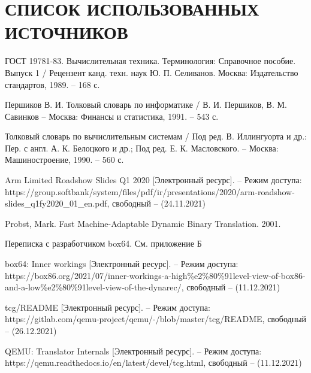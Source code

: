 \section*{СПИСОК ИСПОЛЬЗОВАННЫХ ИСТОЧНИКОВ}

\begingroup
\renewcommand{\section}[2]{}
\begin{thebibliography}{}
	ГОСТ 19781-83. Вычислительная техника. Терминология: Справочное пособие. Выпуск 1 / Рецензент канд. техн. наук Ю. П. Селиванов. Москва: Издательство стандартов, 1989. -- 168 с.
		 		 
	Першиков В. И. Толковый словарь по информатике / В. И. Першиков, В. М. Савинков -- Москва: Финансы и статистика, 1991. -- 543 с.
	
	Толковый словарь по вычислительным системам / Под ред. В. Иллингуорта и др.: Пер. с англ. А. К. Белоцкого и др.; Под ред. Е. К. Масловского. -- Москва: Машиностроение, 1990. -- 560 с.
	
	Arm Limited	Roadshow Slides	Q1 2020 [Электронный ресурс]. -- Режим доступа: https://group.softbank/system/files/pdf/ir/presentations/2020/arm-roadshow-slides\_q1fy2020\_01\_en.pdf,
	свободный -- (24.11.2021)
	
	Probst, Mark. Fast Machine-Adaptable Dynamic Binary Translation. 2001.
	
	Переписка с разработчиком box64. См. приложение Б
	
	box64: Inner workings [Электронный ресурс]. -- Режим доступа: https://box86.org/2021/07/inner-workings-a-high\%e2\%80\%91level-view-of-box86-and-a-low\%e2\%80\%91level-view-of-the-dynarec/,
	свободный -- (11.12.2021)
	
	tcg/README  [Электронный ресурс]. -- Режим доступа: https://gitlab.com/qemu-project/qemu/-/blob/master/tcg/README,
	свободный -- (26.12.2021)
	
	QEMU: Translator Internals [Электронный ресурс]. -- Режим доступа: https://qemu.readthedocs.io/en/latest/devel/tcg.html,
	свободный -- (11.12.2021)
	


\end{thebibliography}
